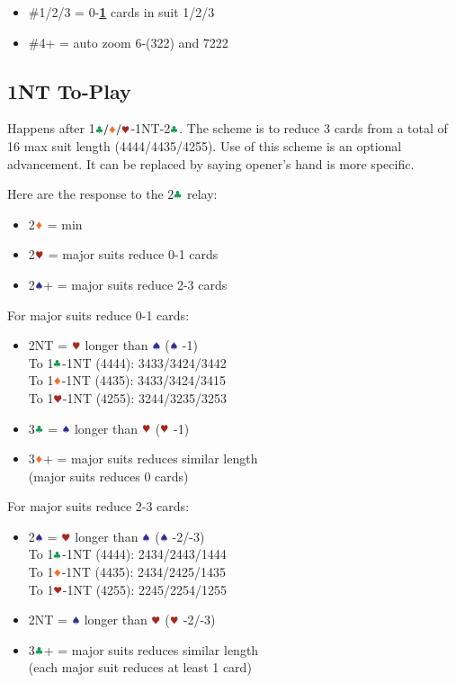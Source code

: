 \documentclass{article}
\begin{document}
\begin{multicols}{2}
\begin{CJK*}{UTF8}{gt}
\begin{itemize}
    \item \#1/2/3 = 0-\textbf{\underline{1}} cards in suit 1/2/3
    \item \#4+ = auto zoom 6-(322) and 7222
\end{itemize}

\subsection{1NT To-Play}\label{sec:1nt-to-play}
Happens after 1$\ccc/\ddd/\hhh$-1NT-2$\ccc$. The scheme is to reduce 3 cards from a total of 16 max suit length (4444/4435/4255). Use of this scheme is an optional advancement. It can be replaced by saying opener's hand is more specific.

\columnbreak

\noindent Here are the response to the 2$\ccc$ relay:
\begin{itemize}
    \item 2$\ddd$ = min
    \item 2$\hhh$ = major suits reduce 0-1 cards
    \item 2$\sss$+ = major suits reduce 2-3 cards
\end{itemize}

\noindent For major suits reduce 0-1 cards:
\begin{itemize}
    \item 2NT = $\hhh$ longer than $\sss$ ($\sss$ -1) \\
        To 1$\ccc$-1NT (4444): 3433/3424/3442 \\
        To 1$\ddd$-1NT (4435): 3433/3424/3415 \\
        To 1$\hhh$-1NT (4255): 3244/3235/3253
    \item 3$\ccc$ = $\sss$ longer than $\hhh$ ($\hhh$ -1)
    \item 3$\ddd$+ = major suits reduces similar length \\
        (major suits reduces 0 cards)
\end{itemize}

\noindent For major suits reduce 2-3 cards:
\begin{itemize}
    \item 2$\sss$ = $\hhh$ longer than $\sss$ ($\sss$ -2/-3) \\
        To 1$\ccc$-1NT (4444): 2434/2443/1444 \\
        To 1$\ddd$-1NT (4435): 2434/2425/1435 \\
        To 1$\hhh$-1NT (4255): 2245/2254/1255
    \item 2NT = $\sss$ longer than $\hhh$ ($\hhh$ -2/-3)
    \item 3$\ccc$+ = major suits reduces similar length \\
        (each major suit reduces at least 1 card)
\end{itemize}


\end{CJK*}
\end{multicols}
\end{document}
